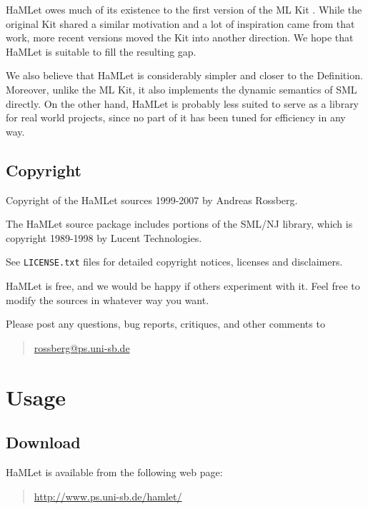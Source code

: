 \documentclass[twoside,titlepage]{article}
\begin{document}
HaMLet owes much of its existence to the first version of the ML Kit \cite{kit}. While the original Kit shared a similar motivation and a lot of inspiration came from that work, more recent versions moved the Kit into another direction. We hope that HaMLet is suitable to fill the resulting gap.

We also believe that HaMLet is considerably simpler and closer to the Definition. Moreover, unlike the ML Kit, it also implements the dynamic semantics of SML directly.
On the other hand, HaMLet is probably less suited to serve as a library for real world projects, since no part of it has been tuned for efficiency in any way.


\subsection{Copyright}
\label{copyright}

Copyright of the HaMLet sources 1999-2007 by Andreas Rossberg.

The HaMLet source package includes portions of the SML/NJ library, which is copyright 1989-1998 by Lucent Technologies.

See {\tt LICENSE.txt} files for detailed copyright notices, licenses and disclaimers.

HaMLet is free, and we would be happy if others experiment with it. Feel free to modify the sources in whatever way you want.

Please post any questions, bug reports, critiques, and other comments to

\begin{quote}
\url{rossberg@ps.uni-sb.de}
\end{quote}



\section{Usage}
\label{usage}

\subsection{Download}
\label{download}

HaMLet is available from the following web page:

\begin{quote}
\url{http://www.ps.uni-sb.de/hamlet/}
\end{quote}
\end{document}
